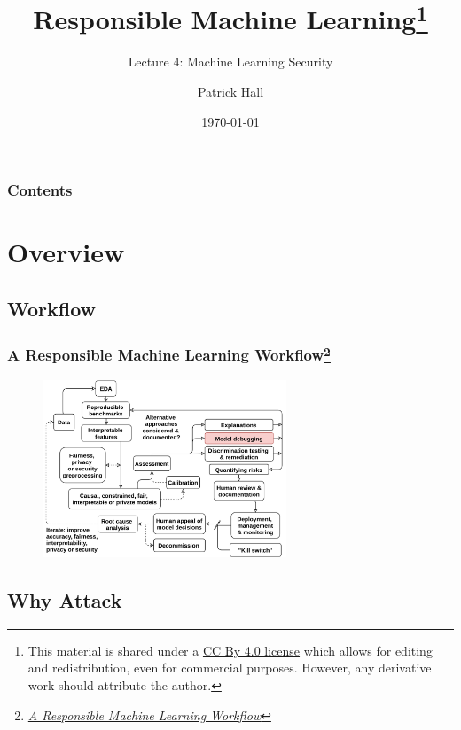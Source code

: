 \documentclass[11pt,
               aspectratio=169,
               hyperref={colorlinks}
               ]{beamer}
\author{Patrick Hall}
\title{Responsible Machine Learning\footnote{\tiny{This material is shared under a \href{https://creativecommons.org/licenses/by/4.0/deed.ast}{CC By 4.0 license} which allows for editing and redistribution, even for commercial purposes. However, any derivative work should attribute the author.}}}
\subtitle{Lecture 4: Machine Learning Security}
\institute{The George Washington University}
\date{\today}
\begin{document}
	
	\maketitle
	
	\begin{frame}
	
		\frametitle{Contents}
		
		\tableofcontents{}
		
	\end{frame}
	
	
	\section{Overview}
		\subsection{Workflow} %
			
		\begin{frame}
		
			\frametitle{A Responsible Machine Learning Workflow\footnote{\href{https://www.mdpi.com/2078-2489/11/3/137/htm}{\textit{A Responsible Machine Learning Workflow}}}}
			
			\begin{figure}[htb]
				\begin{center}
					\includegraphics[height=150pt]{../img/rml_diagram_lec4_hilite.png}
					\label{fig:blueprint}
				\end{center}
			\end{figure}		
					
		\end{frame}	


		\subsection{Why Attack}
\end{document}
